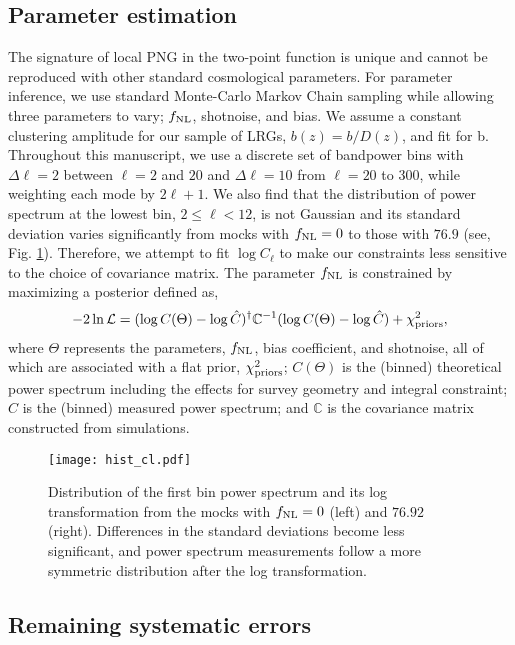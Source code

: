 \subsection{Parameter estimation}
The signature of local PNG in the two-point function is unique and cannot be reproduced with other standard cosmological parameters. For parameter inference, we use standard Monte-Carlo Markov Chain sampling while allowing three parameters to vary; $f_{\rm NL}$, shotnoise, and bias. We assume a constant clustering amplitude for our sample of LRGs, $b(z) = b/D(z)$, and fit for b. Throughout this manuscript, we use a discrete set of bandpower bins with $\Delta\ell=2$ between $\ell=2$ and $20$ and $\Delta \ell=10$ from $\ell=20$ to $300$, while weighting each mode by $2\ell+1$. We also find that the distribution of power spectrum at the lowest bin, $2\leq \ell < 12$,  is not Gaussian and its standard deviation varies significantly from mocks with $f_{\rm NL}=0$ to those with $76.9$ (see, Fig. \ref{fig:histcell}). Therefore, we attempt to fit $\log C_{\ell}$ to make our constraints less sensitive to the choice of covariance matrix. The parameter $f_{\rm NL}$ is constrained by maximizing a posterior defined as,
\begin{equation}
-2\ln\mathcal{L} = (\log C(\Theta)-\log \hat{C})^{\dagger} \mathbb{C}^{-1} (\log C(\Theta)-\log \hat{C}) + \chi^{2}_{\rm priors},
\end{equation}
where $\Theta$ represents the parameters, $f_{\rm NL}$, bias coefficient, and shotnoise, all of which are associated with a flat prior, $\chi^{2}_{\rm priors}$; $C(\Theta)$ is the (binned) theoretical power spectrum including the effects for survey geometry and integral constraint; $\hat{C}$ is the (binned) measured power spectrum; and $\mathbb{C}$ is the covariance matrix constructed from simulations. 

\begin{figure}
\centering
\texttt{[image: hist\_cl.pdf]}
\caption{Distribution of the first bin power spectrum and its log transformation from the mocks with $f_{\rm NL}=0$ (left) and $76.92$ (right). Differences in the standard deviations become less significant, and power spectrum measurements follow a more symmetric distribution after the log transformation.}\label{fig:histcell}
\end{figure}


\subsection{Remaining systematic errors}
\label{ssec:characterization}


